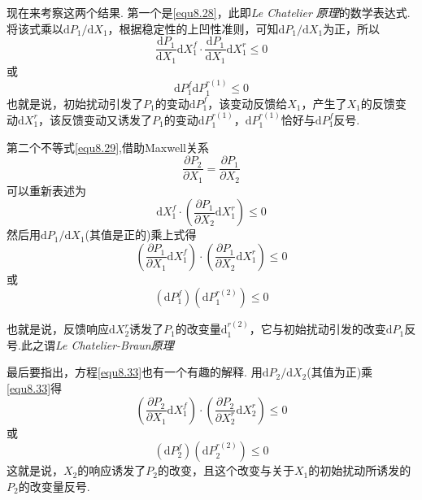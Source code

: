 现在来考察这两个结果. 第一个是\ref{equ8.28}，此即\textsl{Le Chatelier 原理}的数学表达式. 将该式乘以$\text{d}P_1/\text{d}X_1 $，根据稳定性的上凹性准则，可知$\text{d}P_1/\text{d}X_1$为正，所以
\begin{equation}
\label{equ8.30}
\frac{\text{d}P_1}{\text{d}X_1} \text{d}X_1^f\cdot \frac{\text{d}P_1}{\text{d}X_1} \text{d}X_1^r \le 0
\end{equation}
或
\begin{equation}
\label{equ8.31}
{\text{d}P_1^f}{\text{d}P_1^{r(1)}} \le 0
\end{equation}
也就是说，初始扰动引发了$P_1$的变动$\text{d}{P_1^f}$，该变动反馈给$X_1$，产生了$X_1$的反馈变动$\text{d}X_1^r$，该反馈变动又诱发了$P_1$的变动$\text{d}P_1^{r(1)} $，$\text{d}P_1^{r(1)} $恰好与$\text{d}{P_1^f}$反号.

第二个不等式\ref{equ8.29},借助Maxwell关系
\begin{equation}
\label{equ8.32}
\frac{\partial P_2}{\partial X_1}=\frac{\partial P_1}{\partial X_2}
\end{equation}
可以重新表述为
\begin{equation}
\label{equ8.33}
\text{d}X_1^f\cdot\left(\frac{\partial P_1}{\partial X_2}\text{d}X_1^r \right)\leq 0 
\end{equation}
然后用$\text{d}P_1 /\text{d}X_1$(其值是正的)乘上式得
\begin{equation}
\label{8.34}
\left(\frac{\partial P_1}{\partial X_1}\text{d}X_1^f\right)\cdot \left(\frac{\partial P_1}{\partial X_2}\text{d}X_1^r\right)\leq 0
\end{equation}
或
\begin{equation}
\label{8.35}
(\text{d}P_1^f )(\text{d}P_1^{r(2)} )\leq 0
\end{equation}

也就是说，反馈响应$\text{d}X_2^r$诱发了$P_1$的改变量$\text{d}_1^{r(2)} $，它与初始扰动引发的改变$\text{d}P_1 $反号.此之谓\textsl{Le Chatelier-Braun原理}

最后要指出，方程\ref{equ8.33}也有一个有趣的解释. 用$\text{d}P_2/\text{d}X_2$(其值为正)乘\ref{equ8.33}得
\begin{equation}
\label{equ8.36}
\left(\frac{\partial P_2}{\partial X_1}\text{d}X_1^f\right)\cdot \left(\frac{\partial P_2}{\partial X_2^r}\text{d}X_2^r\right)\leq 0
\end{equation}
或
\begin{equation}
(\text{d}P_2^f )(\text{d}P_2^{r(2)} )\leq 0
\end{equation}
这就是说，$X_2$的响应诱发了$P_2$的改变，且这个改变与关于$X_1$的初始扰动所诱发的$P_2$的改变量反号.
